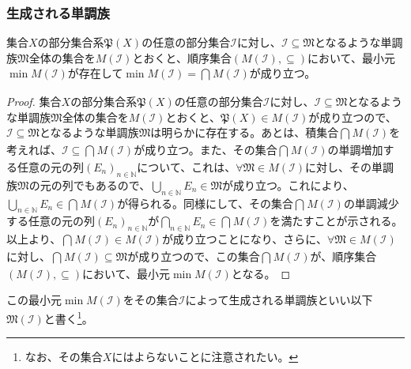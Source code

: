 \documentclass[dvipdfmx]{jsarticle}
\begin{document}
\subsubsection{生成される単調族}%
\begin{thm}\label{4.5.6.5}
集合$X$の部分集合系$\mathfrak{P}(X)$の任意の部分集合$\mathcal{I}$に対し、$\mathcal{I \subseteq}\mathfrak{M}$となるような単調族$\mathfrak{M}$全体の集合を$M\left( \mathcal{I} \right)$とおくと、順序集合$\left( M\left( \mathcal{I} \right), \subseteq \right)$において、最小元$\min{M\left( \mathcal{I} \right)}$が存在して$\min{M\left( \mathcal{I} \right)} = \bigcap_{} {M\left( \mathcal{I} \right)}$が成り立つ。
\end{thm}
\begin{proof}
集合$X$の部分集合系$\mathfrak{P}(X)$の任意の部分集合$\mathcal{I}$に対し、$\mathcal{I \subseteq}\mathfrak{M}$となるような単調族$\mathfrak{M}$全体の集合を$M\left( \mathcal{I} \right)$とおくと、$\mathfrak{P}(X) \in M\left( \mathcal{I} \right)$が成り立つので、$\mathcal{I \subseteq}\mathfrak{M}$となるような単調族$\mathfrak{M}$は明らかに存在する。あとは、積集合$\bigcap_{} {M\left( \mathcal{I} \right)}$を考えれば、$\mathcal{I \subseteq}\bigcap_{} {M\left( \mathcal{I} \right)}$が成り立つ。また、その集合$\bigcap_{} {M\left( \mathcal{I} \right)}$の単調増加する任意の元の列$\left( E_{n} \right)_{n \in \mathbb{N}}$について、これは、$\mathfrak{\forall M \in}M\left( \mathcal{I} \right)$に対し、その単調族$\mathfrak{M}$の元の列でもあるので、$\bigcup_{n \in \mathbb{N}} E_{n}\in \mathfrak{M}$が成り立つ。これにより、$\bigcup_{n \in \mathbb{N}} E_{n} \in \bigcap_{} {M\left( \mathcal{I} \right)}$が得られる。同様にして、その集合$\bigcap_{} {M\left( \mathcal{I} \right)}$の単調減少する任意の元の列$\left( E_{n} \right)_{n \in \mathbb{N}}$が$\bigcap_{n \in \mathbb{N}} E_{n} \in \bigcap_{} {M\left( \mathcal{I} \right)}$を満たすことが示される。以上より、$\bigcap_{} {M\left( \mathcal{I} \right)} \in M\left( \mathcal{I} \right)$が成り立つことになり、さらに、$\mathfrak{\forall M \in}M\left( \mathcal{I} \right)$に対し、$\bigcap_{} {M\left( \mathcal{I} \right)}\subseteq \mathfrak{M}$が成り立つので、この集合$\bigcap_{} {M\left( \mathcal{I} \right)}$が、順序集合$\left( M\left( \mathcal{I} \right), \subseteq \right)$において、最小元$\min{M\left( \mathcal{I} \right)}$となる。
\end{proof}
\begin{dfn}
この最小元$\min{M\left( \mathcal{I} \right)}$をその集合$\mathcal{I}$によって生成される単調族といい以下$\mathfrak{M}\left( \mathcal{I} \right)$と書く\footnote{なお、その集合$X$にはよらないことに注意されたい。}。
\end{dfn}
\end{document}
